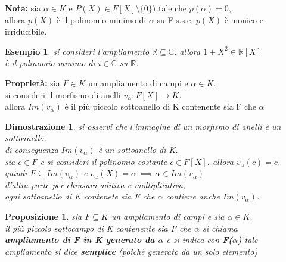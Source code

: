 \documentclass[a4paper,12pt]{article}
\theoremstyle{def}
\theoremstyle{prop}
\newtheorem*{proposition}{Proposizione}
\theoremstyle{esempio}
\newtheorem*{example}{Esempio}
\theoremstyle{dimostrazione}
\newtheorem*{dimostrazione}{Dimostrazione}
\theoremstyle{teo}
\theoremstyle{osservazione}
\begin{document}
\textbf{Nota:} sia \(\alpha \in K\) e \(P(X) \in F[X] \setminus \{0\})\) tale che \(p(\alpha) = 0\),\\
allora \(p(X)\) è il polinomio minimo di \(\alpha\) su F s.s.e. \(p(X)\) è monico e irriducibile.\\

\begin{example}
	si consideri l'ampliamento \(\mathbb{R} \subseteq \mathbb{C}\). allora \(1 + X^2 \in \mathbb{R}[X]\)\\
	è il polinomio minimo di \(i \in \mathbb{C}\) su \(\mathbb{R}\).
\end{example}

\newpage

\textbf{Proprietà:} sia \(F \in K\) un ampliamento di campi e \(\alpha \in K\).\\
si consideri il morfismo di anelli \(v_\alpha: F[X] \rightarrow K\).\\
allora \(Im(v_\alpha)\) è il più piccolo sottoanello di K contenente sia F che \(\alpha\)

\begin{dimostrazione}
	si osservi che l'immagine di un morfismo di anelli è un sottoanello.\\
	di conseguenza \(Im(v_\alpha)\) è un sottoanello di K.\\
	sia \(c \in F\) e si consideri il polinomio costante \(c \in F[X]\). allora \(v_\alpha(c)=c\).\\
	quindi \(F \subseteq Im(v_\alpha)\) e \(v_\alpha(X) = \alpha\ \implies \alpha \in Im(v_\alpha)\)\\
	d'altra parte per chiusura aditiva e moltiplicativa,\\
	ogni sottoanello di K contenete sia F che \(\alpha\) contiene anche \(Im(v_\alpha)\).
\end{dimostrazione}

\begin{proposition}
	sia \(F \subseteq K\) un ampliamento di campi e sia \(\alpha \in K\).\\
	il più piccolo sottocampo di K contenente sia F che \(\alpha\) si chiama\\
	\textbf{ampliamento di F in K generato da \(\alpha\)} e si indica con \textbf{F(\(\alpha\))}
	tale ampliamento si dice \textbf{semplice} (poichè generato da un solo elemento)
\end{proposition}

\vspace{\baselineskip}
\end{document}
